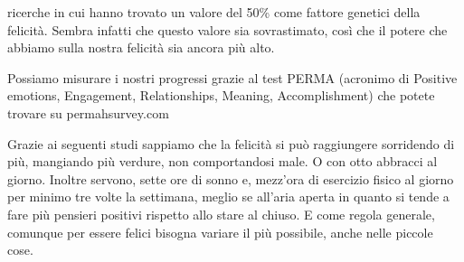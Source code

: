 \documentclass[12pt]{book} %
\begin{document}
ricerche in cui hanno trovato un valore del 50\% come fattore genetici della felicità. Sembra infatti che questo valore
sia sovrastimato, così che il potere che abbiamo sulla nostra felicità sia ancora più alto.

Possiamo misurare i nostri progressi grazie al test PERMA (acronimo di Positive emotions, Engagement, Relationships,
Meaning, Accomplishment) che potete trovare su permahsurvey.com 


\bigskip
\begin{mdframed}[linewidth=1pt]
Grazie ai seguenti studi sappiamo che la felicità si può raggiungere
sorridendo di più, mangiando più
verdure, non comportandosi
male. O con otto abbracci al
giorno. Inoltre servono, sette ore di
sonno e, mezz'ora di esercizio fisico al giorno per minimo tre volte la settimana, meglio se
all'aria aperta in quanto si tende a fare più pensieri positivi rispetto allo stare al
chiuso. E come regola generale, comunque per essere
felici bisogna variare il più possibile, anche nelle piccole cose.


\bigskip


\end{mdframed}
\end{document}
